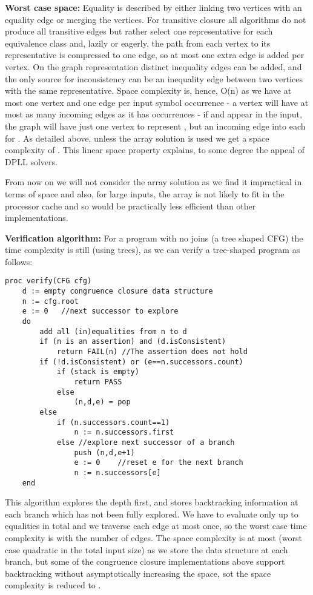 \textbf{Worst case space:} Equality is described by either linking two vertices with an equality edge or merging the vertices. For transitive closure all algorithms do not produce all transitive edges but rather select one representative for each equivalence class and, lazily or eagerly, the path from each vertex to its representative is compressed to one edge, so at most one extra edge is added per vertex.
On the graph representation distinct inequality edges can be added, and the only source for inconsistency can be an inequality edge between two vertices with the same representative. Space complexity is, hence, O(n) as we have at most one vertex and one edge per input symbol occurrence - a vertex will have at most as many incoming edges as it has occurrences - if  and  appear in the input, the graph will have just one vertex to represent , but an incoming edge into  each for .
As detailed above, unless the array solution is used we get a space complexity of .
This linear space property explains, to some degree the appeal of DPLL solvers.

From now on we will not consider the array solution as we find it impractical in terms of space and also, for large inputs, the array is not likely to fit in the processor cache and so would be practically less efficient than other implementations. 

\textbf{Verification algorithm:}
For a program with no joins (a tree shaped CFG) the time complexity is still  (using trees), as we can verify a tree-shaped program as follows:
\begin{lstlisting}
proc verify(CFG cfg)
	d := empty congruence closure data structure
	n := cfg.root
	e := 0   //next successor to explore
	do
		add all (in)equalities from n to d
		if (n is an assertion) and (d.isConsistent)
			return FAIL(n) //The assertion does not hold
		if (!d.isConsistent) or (e==n.successors.count)
			if (stack is empty)
				return PASS
			else
				(n,d,e) = pop
		else
			if (n.successors.count==1)
				n := n.successors.first
			else //explore next successor of a branch
				push (n,d,e+1)
				e := 0    //reset e for the next branch
				n := n.successors[e]
	end
\end{lstlisting}
This algorithm explores the depth first, and stores backtracking information at each branch which has not been fully explored.
We have to evaluate only up to  equalities in total and we traverse each edge at most once, so the worst case time complexity is  with  the number of edges. 
The space complexity is at most  (worst case quadratic in the total input size) as we store the data structure at each branch, but some of the congruence closure implementations above support backtracking without asymptotically increasing the space, sot the space complexity is reduced to .

